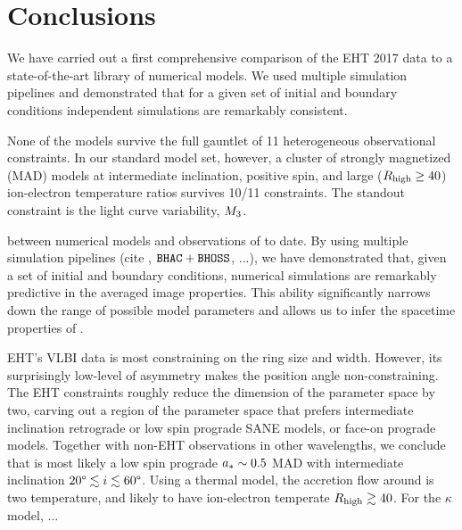 \section{Conclusions}
\label{sec:conclusions}


We have carried out a first comprehensive comparison of the EHT 2017 \sgra data to a state-of-the-art library of numerical models.  We used multiple simulation pipelines and demonstrated that for a given set of initial and boundary conditions independent simulations are remarkably consistent.

None of the models survive the full gauntlet of 11 heterogeneous observational constraints.  In our standard model set, however, a cluster of strongly magnetized (MAD) models at intermediate inclination, positive spin, and large ($R_\mathrm{high} \ge 40$) ion-electron temperature ratios survives 10/11 constraints.  The standout constraint is the light curve variability, $M_{3}$.


between numerical models and observations of \sgra to date.
By using multiple simulation pipelines (cite \patoka, $\texttt{BHAC}+\texttt{BHOSS}$,
...), we have demonstrated that, given a set of initial and boundary
conditions, numerical simulations are remarkably predictive in the
averaged image properties.
This ability significantly narrows down the range of possible model
parameters and allows us to infer the spacetime properties of \sgra
{}.

EHT's VLBI data is most constraining on the ring size and width.
However, its surprisingly low-level of asymmetry makes the position
angle non-constraining.
The EHT constraints roughly reduce the dimension of the parameter
space by two, carving out a region of the parameter space that prefers
intermediate inclination retrograde or low spin prograde SANE models,
or face-on prograde models.
Together with non-EHT observations in other wavelengths, we conclude
that \sgra is most likely a low spin prograde $a_* \sim 0.5$ MAD with
intermediate inclination $20\degree \lesssim i \lesssim 60\degree$.
Using a thermal model, the accretion flow around \sgra is two
temperature, and likely to have ion-electron temperate $R_\mathrm{high} \gtrsim
40$.
For the $\kappa$ model, ...

